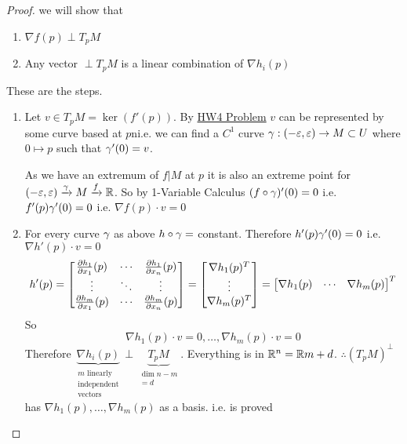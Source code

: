 \parinn
\begin{proof}
	we will show that \begin{enumerate}[label=\bfseries\tiny\protect\circled{\small\arabic*}]
		\item  $\nabla f(p)\perp T_pM$
		\item Any vector $\perp T_pM$ is a linear combination of $\nabla h_i(p)$
	\end{enumerate}
These are the steps. 
\begin{enumerate}[label=\bfseries\tiny\protect\circled{\small\arabic*}]
	\item Let $v\in T_pM=\ker (f'(p))$. By \href{https://drive.google.com/file/d/11OCy_upvhLy8mH0jCKwFbXqzEX3FBT8Z/view?usp=share_link}{HW4 Problem} $v$ can be represented by some curve based at $p$ni.e. we can find a $C^1$ curve $\gamma:(-\varepsilon,\varepsilon)\to M\subset U$ where $0\mapsto p$ such that $\gamma'(0)=v$. 
	
	As we have an extremum of $f|M$ at $p$ it is also an extreme point for $(-\varepsilon,\varepsilon)\xrightarrow{\gamma}M\xrightarrow{f}\mathbb{R}$. So by 1-Variable Calculus $(f\circ\gamma)'(0)=0$ i.e. $f'(p)\gamma'(0)=0$ i.e. $\nabla f(p)\cdot v=0$
	
	\item For every curve $\gamma$ as above $h\circ \gamma=$ constant. Therefore $h'(p)\gamma'(0)=0$ i.e. $\nabla h'(p)\cdot v=0$ $$h'(p)=\left[\begin{matrix} \frac{\partial h_1}{\partial x_1}(p)   & \cdots & \frac{\partial h_1}{\partial x_n}(p) \\ \vdots & \ddots & \vdots \\ \frac{\partial h_m}{\partial x_1}(p)   & \cdots & \frac{\partial h_m}{\partial x_n}(p)  \end{matrix}\right]=\left[\begin{matrix}\nabla h_1(p)^T \\ \vdots \\ \nabla h_m(p)^T\end{matrix}\right]=\left[\begin{matrix}\nabla h_1(p) & \cdots & \nabla h_m(p)\end{matrix}\right]^T$$ So $$\nabla h_1(p)\cdot v=0,\dots , \nabla h_m(p)\cdot v=0$$Therefore $\underset{\substack{ m\text{ linearly} \\ \text{independent} \\ \text{vectors}  }}{\underbrace{\nabla h_i(p)}}\perp \underset{\substack{ \dim n-m \\ =d }}{\underbrace{T_pM}}$. Everything is in $\mathbb{R}^n=\mathbb{R}{m+d}$. $\therefore (T_pM)^{\perp}$ has $\nabla h_1(p),\dots, \nabla h_m(p)$ as a basis. i.e.  is proved
\end{enumerate}
\end{proof}

